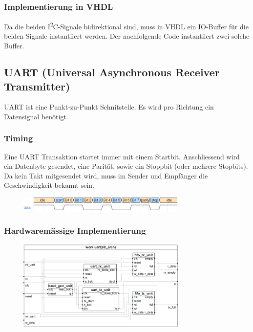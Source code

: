\subsubsection{Implementierung in VHDL}
Da die beiden I\textsuperscript{2}C-Signale bidirektional sind, muss in VHDL ein IO-Buffer für die beiden Signale instantiiert werden. Der nachfolgende Code instantiiert zwei solche Buffer.


\subsection{UART (Universal Asynchronous Receiver Transmitter)}
UART ist eine Punkt-zu-Punkt Schnitstelle. Es wird pro Richtung ein Datensignal benötigt.

\subsubsection{Timing}
Eine UART Transaktion startet immer mit einem Startbit. Anschliessend wird ein Datenbyte gesendet, eine Parität, sowie ein Stoppbit (oder mehrere Stopbits). Da kein Takt mitgesendet wird, muss im Sender und Empfänger die Geschwindigkeit bekannt sein.
\begin{figure}[H]
    \includegraphics[width=0.75\textwidth]{images/uart_timing.png}
\end{figure}

\subsubsection{Hardwaremässige Implementierung}
\begin{figure}[H]
    \includegraphics[width=0.75\textwidth]{images/uart_hardware.png}
\end{figure}

